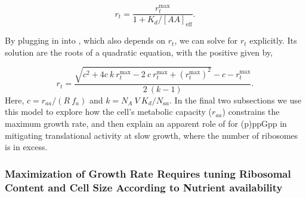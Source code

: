 \begin{equation}
r_t = \frac{r_{t}^{\text{max}}}{1 + K_d/[AA]_{\text{eff}}}.
\label{eq:rt_kd_simple}
\end{equation}

By plugging in  into , which also depends on $r_t$, we
can solve for $r_t$ explicitly. Its solution are the roots of a quadratic equation,
with the positive given by,

\begin{equation}
r_t = \frac{\sqrt{c^2 + 4 c \ k \ r_{t}^{\text{max}} - 2 \ c \ r_{t}^{\text{max}} + (r_{t}^{\text{max}})^2} - c - r_{t}^{\text{max}}}{2 \ (k-1)}.
\label{eq:rt_final}
\end{equation}
Here, $c = r_{aa}/(R \ f_a)$ and $k = N_A \ V \ K_d / N_{aa}$. In the final two
subsections we use this model to explore how the cell's metabolic capacity
($r_{aa}$) constrains the maximum growth rate, and then explain an apparent role
of for (p)ppGpp in mitigating translational activity at slow growth, where the
number of ribosomes is in excess.

\subsubsection{Maximization of Growth Rate Requires tuning Ribosomal Content
and Cell Size According to Nutrient availability}

